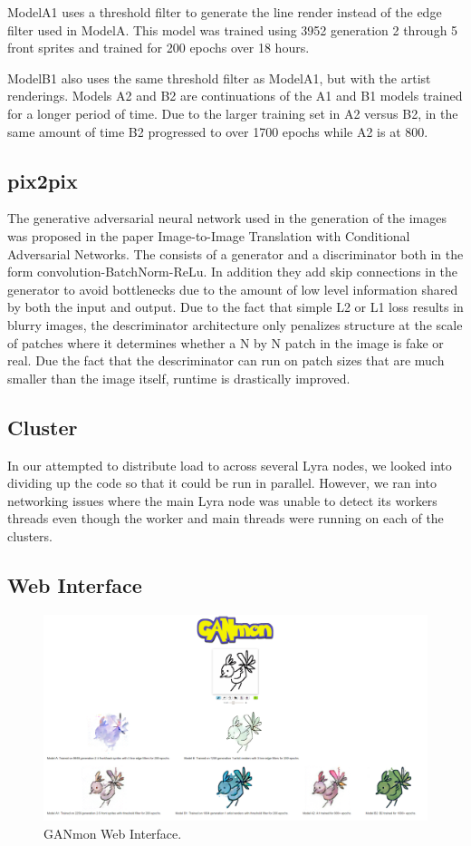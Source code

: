 \documentclass[sigchi]{acmart}
\begin{document}
ModelA1 uses a threshold filter to generate the line render instead of the edge filter used in ModelA. This model was trained using 3952 generation 2 through 5 front sprites and trained for 200 epochs over 18 hours.

ModelB1 also uses the same threshold filter as ModelA1, but with the artist renderings. Models A2 and B2 are continuations of the A1 and B1 models trained for a longer period of time. Due to the larger training set in A2 versus B2, in the same amount of time B2 progressed to over 1700 epochs while A2 is at 800.

\subsection{pix2pix}
The generative adversarial neural network used in the generation of the images was proposed in the paper Image-to-Image Translation with Conditional Adversarial Networks. The consists of a generator and a discriminator both in the form convolution-BatchNorm-ReLu. In addition they add skip connections in the generator to avoid bottlenecks due to the amount of low level information shared by both the input and output. Due to the fact that simple L2 or L1 loss results in blurry images, the descriminator architecture only penalizes structure at the scale of patches where it determines whether a N by N patch in the image is fake or real. Due the fact that the descriminator can run on patch sizes that are much smaller than the image itself, runtime is drastically improved. 

\subsection{Cluster}
In our attempted to distribute load to across several Lyra nodes, we looked into dividing up the code so that it could be run in parallel. However, we ran into networking issues where the main Lyra node was unable to detect its workers threads even though the worker and main threads were running on each of the clusters.

\subsection{Web Interface}

\begin{figure}
\includegraphics[width=7in]{figures/GANmonWeb.jpg}
\caption{GANmon Web Interface.}
\end{figure}
\end{document}
